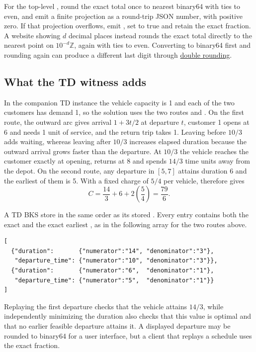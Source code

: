 For the top-level , round the exact total once to nearest binary64 with ties to even, and emit a finite projection as a round-trip JSON number, with positive zero. If that projection overflows, emit , set  to true and retain the exact fraction. A website showing $d$ decimal places instead rounds the exact total directly to the nearest point on $10^{-d}\mathbb{Z}$, again with ties to even. Converting to binary64 first and rounding again can produce a different last digit through \href{https://en.wikipedia.org/wiki/Rounding#Double_rounding}{double rounding}.

\subsection{What the TD witness adds}

In the companion TD instance the vehicle capacity is 1 and each of the two customers has demand 1, so the solution uses the two routes \id{[1]} and \id{[2]}. On the first route, the outward arc gives arrival $1+3t/2$ at departure $t$, customer 1 opens at 6 and needs 1 unit of service, and the return trip takes 1. Leaving before $10/3$ adds waiting, whereas leaving after $10/3$ increases elapsed duration because the outward arrival grows faster than the departure. At $10/3$ the vehicle reaches the customer exactly at opening, returns at 8 and spends $14/3$ time units away from the depot. On the second route, any departure in $[5,7]$ attains duration 6 and the earliest of them is 5. With a fixed charge of $5/4$ per vehicle,  therefore gives
\[
 C=\frac{14}{3}+6+2\left(\frac54\right)=\frac{79}{6}.
\]

A TD BKS \must{} store  in the same order as its stored . Every entry contains both the exact  and the exact earliest , as in the following array for the two routes above.
\begin{verbatim}
[
  {"duration":       {"numerator":"14", "denominator":"3"},
   "departure_time": {"numerator":"10", "denominator":"3"}},
  {"duration":       {"numerator":"6",  "denominator":"1"},
   "departure_time": {"numerator":"5",  "denominator":"1"}}
]
\end{verbatim}
Replaying the first departure checks that the vehicle attains $14/3$, while independently minimizing the duration also checks that this value is optimal and that no earlier feasible departure attains it. A displayed departure may be rounded to binary64 for a user interface, but a client that replays a schedule uses the exact fraction.

